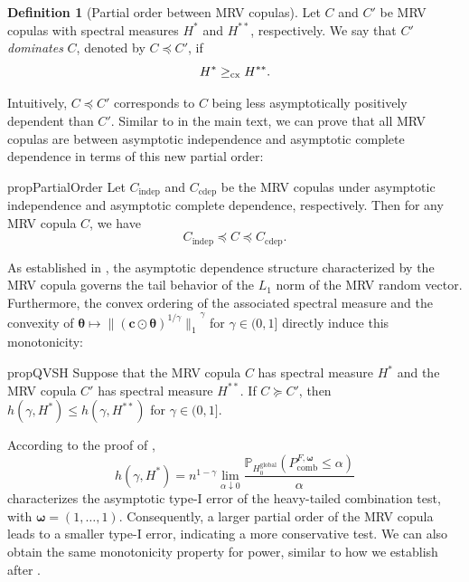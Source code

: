 \documentclass[12pt]{article}
\theoremstyle{plain}
\theoremstyle{plain}
\theoremstyle{definition}
\newtheorem{defn}{Definition}[section]
\renewcommand{\Pr}{\mathbb{P}}
\begin{document}
\begin{defn}[Partial order between MRV copulas]
Let $C$ and $C'$ be MRV copulas with spectral measures $H^*$
and $H^{**}$, respectively. We say that $C'$ \emph{dominates} $C$, denoted by $C\preceq C'$, if
$$ H^*\ge_{\rm cx} H^{**}.$$
\end{defn}
Intuitively, $C\preceq C'$ corresponds to $C$ being less asymptotically positively dependent than $C'$. Similar to  in the main text, we can prove that all MRV copulas are between asymptotic independence and asymptotic complete dependence in terms of this new partial order:
\begin{restatable}{prop}{PartialOrder}
\label{prop:partial-order}
Let $C_\mathrm{indep}$ and $C_{\mathrm{cdep}}$ be the MRV copulas under asymptotic independence and asymptotic complete dependence, respectively. Then for any MRV copula $C$, we have
$$C_\mathrm{indep} \preceq C \preceq C_{\mathrm{cdep}}.$$
\end{restatable}
As established in , the asymptotic dependence structure characterized by the MRV copula governs the tail behavior of the $L_1$ norm of the MRV random vector. Furthermore, the convex ordering of the associated spectral measure and the convexity of  $\bm{\theta}\mapsto {{\|(\mathbf{c}\odot\bm{\theta})^{1/\gamma}\|_1}^\gamma}$ for $\gamma\in (0,1]$ directly induce  this monotonicity:
\begin{restatable}{prop}{QVSH}
\label{prop:q-vs-H}
Suppose that the MRV copula $C$ has spectral measure $H^*$
and the MRV copula $C'$ has spectral measure $H^{**}$.
If $C\succeq C'$, then $h(\gamma,H^*) \le h(\gamma,H^{**}) $ for $\gamma\in (0,1].$
\end{restatable}
According to the proof of ,
\[
h(\gamma,H^*)=n^{1-\gamma}\lim_{\alpha\downarrow0}\frac{\Pr_{H_0^{\mathrm{global}}}\left(P^{F,\bm{\omega}}_{\mathrm{comb}}\le\alpha\right)}{\alpha}
\]
characterizes the asymptotic type-I error of the heavy-tailed combination test, with $\boldsymbol{\omega}=(1,\dots,1)$. Consequently, a larger partial order of the MRV copula leads to a smaller type-I error, indicating a more conservative test. We can also obtain the same monotonicity property for power, similar to how we establish  after .
\end{document}
